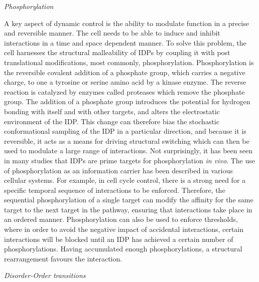 {\it Phosphorylation}

A key aspect of dynamic control is the ability to modulate function in a precise and reversible manner.  The cell needs to be able to induce and inhibit interactions in a time and space dependent manner. To solve this problem, the cell harnesses the structural malleability of IDPs by coupling it with post translational modifications, most commonly, phosphorylation. Phosphorylation is the reversible covalent addition of a phosphate group, which carries a negative charge, to one a tyrosine or serine amino acid by a kinase enzyme. The reverse reaction is catalyzed by enzymes called proteases which remove the phosphate group. The addition of a phosphate group introduces the potential for hydrogen bonding with itself and with other targets, and alters the electrostatic environment of the IDP. This change can therefore bias the stochastic conformational sampling of the IDP in a particular direction, and because it is reversible, it acts as a means for driving structural switching which can then be used to modulate a large range of interactions. Not surprisingly, it has been seen in many studies that IDPs are prime targets for phosphorylation {\it in vivo}.  The use of phosphorylation as an information carrier has been described in various cellular systems. For example, in cell cycle control, there is a strong need for a specific temporal sequence of interactions to be enforced. Therefore, the sequential phosphorylation of a single target can modify the affinity for the same target to the next target in the pathway, ensuring that interactions take place in an ordered manner. Phosphorylation can also be used to enforce thresholds, where in order to avoid the negative impact of accidental interactions, certain interactions will be blocked until an IDP has achieved a certain number of phosphorylations. Having accumulated enough phosphorylations, a structural rearrangement favours the interaction. 

{\it Disorder-Order transitions}

